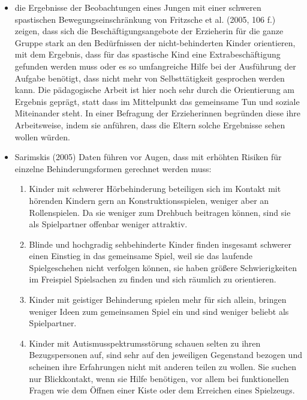 \begin{itemize}
\item die Ergebnisse der Beobachtungen eines Jungen mit einer schweren spastischen Bewegungseinschränkung von Fritzsche et al. (2005, 106 f.)  zeigen, dass sich die Beschäftigungsangebote der Erzieherin für die ganze Gruppe stark an den Bedürfnissen der nicht-behinderten Kinder orientieren, mit dem Ergebnis, dass für das spastische Kind eine Extrabeschäftigung gefunden werden muss oder es so umfangreiche Hilfe bei der Ausführung der Aufgabe benötigt, dass nicht mehr von Selbsttätigkeit gesprochen werden kann. Die pädagogische Arbeit ist hier noch sehr durch die Orientierung am Ergebnis geprägt, statt dass im Mittelpunkt das gemeinsame Tun und soziale Miteinander steht. In einer Befragung der Erzieherinnen begründen diese ihre Arbeitsweise, indem sie anführen, dass die Eltern solche Ergebnisse sehen wollen würden.

\item Sarimskis (2005) Daten führen vor Augen, dass mit erhöhten Risiken für einzelne Behinderungsformen gerechnet werden muss:
\begin{enumerate}
\item Kinder mit schwerer Hörbehinderung beteiligen sich im Kontakt mit hörenden Kindern gern an Konstruktionsspielen, weniger aber an Rollenspielen. Da sie weniger zum Drehbuch beitragen können, sind sie als Spielpartner offenbar weniger attraktiv.
\item Blinde und hochgradig sehbehinderte Kinder finden insgesamt schwerer einen Einstieg in das gemeinsame Spiel, weil sie das laufende Spielgeschehen nicht verfolgen können, sie haben größere Schwierigkeiten im Freispiel Spielsachen zu finden und sich räumlich zu orientieren.
\item Kinder mit geistiger Behinderung spielen mehr für sich allein, bringen weniger Ideen zum gemeinsamen Spiel ein und sind weniger beliebt als Spielpartner.
\item Kinder mit Autismusspektrumsstörung schauen selten zu ihren Bezugspersonen auf, sind sehr auf den jeweiligen Gegenstand bezogen und scheinen ihre Erfahrungen nicht mit anderen teilen zu wollen. Sie suchen nur Blickkontakt, wenn sie Hilfe benötigen, vor allem bei funktionellen Fragen wie dem Öffnen einer Kiste oder dem Erreichen eines Spielzeugs. 
\end{enumerate}
\end{itemize}